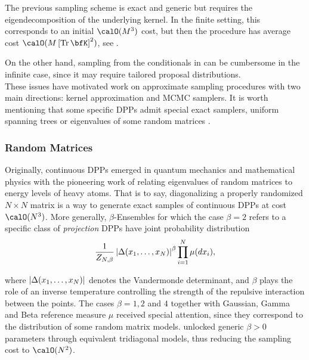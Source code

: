 \documentclass[twoside,11pt]{article}
\begin{document}
      The previous sampling scheme is exact and generic but requires the eigendecomposition of the underlying kernel.
      In the finite setting, this corresponds to an initial $\calO(M^3)$ cost, but then the procedure has average cost $\calO(M\lrb{\Tr \bfK}^2)$,
      see \citep{TrBaAm18}.

      On the other hand, sampling from the conditionals in  can be cumbersome in the infinite case, since it may require tailored proposal distributions.\\

      These issues have motivated work on approximate sampling procedures with two main directions: kernel approximation and MCMC samplers.
      It is worth mentioning that some specific DPPs admit special exact samplers, \eg uniform spanning trees \citep{PrWi98} or eigenvalues of some random matrices \citep{DuEd02}.


    \subsubsection{Random Matrices} %
    \label{ssub:random_matrices}

      Originally, continuous DPPs emerged in quantum mechanics and mathematical physics with the pioneering work of \citet{Wig67} relating eigenvalues of random matrices to energy levels of heavy atoms.
      That is to say, diagonalizing a properly randomized $N\times N$ matrix is a way to generate exact samples of continuous DPPs at cost $\calO(N^3)$.
      More generally, $\beta$-Ensembles for which the case $\beta=2$ refers to a specific class of \textit{projection} DPPs \citep{Kon05} have joint probability distribution
      \begin{equation}
        \frac{1}{Z_{N,\beta}}
        \left| \Delta(x_1,\dots,x_N) \right|^{\beta}
        \prod_{i= 1}^N
          \mu(d x_i),
      \end{equation}

      where $\left| \Delta(x_1,\dots,x_N) \right|$ denotes the Vandermonde determinant, and $\beta$ plays the role of an inverse temperature controlling the strength of the repulsive interaction between the points.
      The cases $\beta=1, 2$ and $4$ together with Gaussian, Gamma and Beta reference measure $\mu$ received special attention, since they correspond to the distribution of some random matrix models.
      \citet{DuEd02} unlocked generic $\beta>0$ parameters through equivalent tridiagonal models, thus reducing the sampling cost to $\calO(N^2)$.
\end{document}
